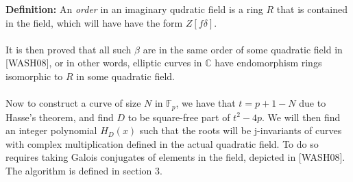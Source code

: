 \documentclass[12pt,twoside]{article}
\begin{document}
\noindent \textbf{Definition:} An \textit{order} in an imaginary qudratic field is a ring $R$ that is contained in the field, which will have have the form $Z[f\delta]$.
\\ \\
\noindent It is then proved that all such $\beta$ are in the same order of some quadratic field in [WASH08], or in other words, elliptic curves in $\mathbb{C}$ have endomorphism rings isomorphic to $R$ in some quadratic field.  
\\ \\ 
\noindent Now to construct a curve of size $N$ in $\mathbb{F}_{p}$, we have that $t = p+1 - N$ due to Hasse's theorem, and find $D$ to be square-free part of  $t^{2} -4p$. We will then find an integer polynomial $H_{D}(x)$ such that the roots will be j-invariants of curves with complex multiplication defined in the actual quadratic field. To do so requires taking Galois conjugates of elements in the field, depicted in [WASH08]. The algorithm is defined in section 3. 


 

\end{document}
